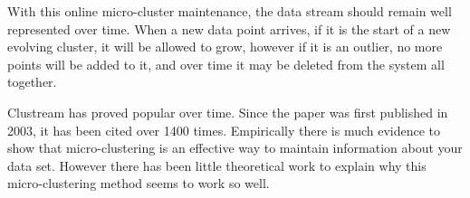 \documentclass[12pt]{report}		%
\begin{document}
With this online micro-cluster maintenance, the data stream should remain well represented over time. When a new data point arrives, if it is the start of a new evolving cluster, it will be allowed to grow, however if it is an outlier, no more points will be added to it, and over time it may be deleted from the system all together.

Clustream has proved popular over time. Since the paper was first published in 2003, it has been cited over 1400 times. Empirically there is much evidence to show that micro-clustering is an effective way to maintain information about your data set. However there has been little theoretical work to explain why this micro-clustering method seems to work so well. 











\end{document}
